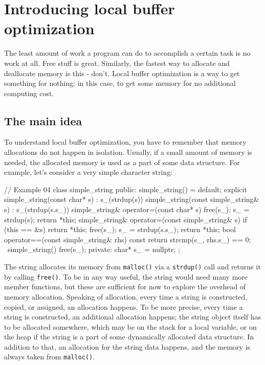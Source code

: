 \section{Introducing local buffer optimization}

The least amount of work a program can do to accomplish a certain task is no work at all. Free stuff is great. Similarly, the fastest way to allocate and deallocate memory is this - don't. Local buffer optimization is a way to get something for nothing; in this case, to get some memory for no additional computing cost.

\subsection{The main idea}

To understand local buffer optimization, you have to remember that memory allocations do not happen in isolation. Usually, if a small amount of memory is needed, the allocated memory is used as a part of some data structure. For example, let's consider a very simple character string:

\begin{code}
// Example 04
class simple_string {
  public:
  simple_string() = default;
  explicit simple_string(const char* s) : s_(strdup(s)) {}
  simple_string(const simple_string& s)
    : s_(strdup(s.s_)) {}
  simple_string& operator=(const char* s) {
    free(s_);
    s_ = strdup(s);
    return *this;
  }
  simple_string& operator=(const simple_string& s) {
    if (this == &s) return *this;
    free(s_);
    s_ = strdup(s.s_);
    return *this;
  }
  bool operator==(const simple_string& rhs) const {
    return strcmp(s_, rhs.s_) == 0;
  }
  ~simple_string() { free(s_); }
  private:
  char* s_ = nullptr;
};
\end{code}

The string allocates its memory from \texttt{malloc()} via a \texttt{strdup()} call and returns it by calling \texttt{free()}. To be in any way useful, the string would need many more member functions, but these are sufficient for now to explore the overhead of memory allocation. Speaking of allocation, every time a string is constructed, copied, or assigned, an allocation happens. To be more precise, every time a string is constructed, an additional allocation happens; the string object itself has to be allocated somewhere, which may be on the stack for a local variable, or on the heap if the string is a part of some dynamically allocated data structure. In addition to that, an allocation for the string data happens, and the memory is always taken from \texttt{malloc()}.

